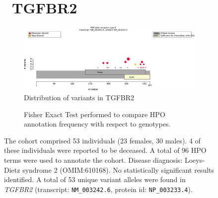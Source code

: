 \begin{figure}[htbp]
\section*{ TGFBR2}
\centering
\begin{subfigure}[b]{0.95\textwidth}
\centering
\includegraphics[width=\textwidth]{ img/TGFBR2_protein_diagram.pdf} 
\captionsetup{justification=raggedright,singlelinecheck=false}
\caption{Distribution of variants in TGFBR2}
\end{subfigure}

\vspace{2em}

\begin{subfigure}[b]{0.95\textwidth}
\centering
{}
\captionsetup{justification=raggedright,singlelinecheck=false}
\caption{Fisher Exact Test performed to compare HPO annotation frequency with respect to genotypes.}
\end{subfigure}

\vspace{2em}

\caption{The cohort comprised 53 individuals (23 females, 30 males). 4 of these individuals were reported to be deceased. A total of 96 HPO terms were used to annotate the cohort. Disease diagnosis: Loeys-Dietz syndrome 2 (OMIM:610168). No statistically significant results identified. A total of 53 unique variant alleles were found in \textit{TGFBR2} (transcript: \texttt{NM\_003242.6}, protein id: \texttt{NP\_003233.4}).}
\end{figure}
